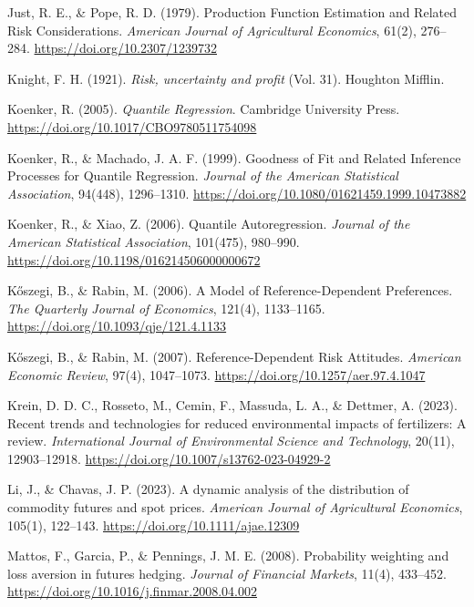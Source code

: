 \documentclass[12pt,a4paper]{article}
\begin{document}
\begin{description}
\item Just, R. E., \& Pope, R. D. (1979). Production Function Estimation and Related Risk Considerations. \textit{American Journal of Agricultural Economics}, 61(2), 276--284. \url{https://doi.org/10.2307/1239732}

\item Knight, F. H. (1921). \textit{Risk, uncertainty and profit} (Vol. 31). Houghton Mifflin.

\item Koenker, R. (2005). \textit{Quantile Regression}. Cambridge University Press. \url{https://doi.org/10.1017/CBO9780511754098}

\item Koenker, R., \& Machado, J. A. F. (1999). Goodness of Fit and Related Inference Processes for Quantile Regression. \textit{Journal of the American Statistical Association}, 94(448), 1296--1310. \url{https://doi.org/10.1080/01621459.1999.10473882}

\item Koenker, R., \& Xiao, Z. (2006). Quantile Autoregression. \textit{Journal of the American Statistical Association}, 101(475), 980--990. \url{https://doi.org/10.1198/016214506000000672}

\item K\H{o}szegi, B., \& Rabin, M. (2006). A Model of Reference-Dependent Preferences. \textit{The Quarterly Journal of Economics}, 121(4), 1133--1165. \url{https://doi.org/10.1093/qje/121.4.1133}

\item K\H{o}szegi, B., \& Rabin, M. (2007). Reference-Dependent Risk Attitudes. \textit{American Economic Review}, 97(4), 1047--1073. \url{https://doi.org/10.1257/aer.97.4.1047}

\item Krein, D. D. C., Rosseto, M., Cemin, F., Massuda, L. A., \& Dettmer, A. (2023). Recent trends and technologies for reduced environmental impacts of fertilizers: A review. \textit{International Journal of Environmental Science and Technology}, 20(11), 12903--12918. \url{https://doi.org/10.1007/s13762-023-04929-2}

\item Li, J., \& Chavas, J. P. (2023). A dynamic analysis of the distribution of commodity futures and spot prices. \textit{American Journal of Agricultural Economics}, 105(1), 122--143. \url{https://doi.org/10.1111/ajae.12309}

\item Mattos, F., Garcia, P., \& Pennings, J. M. E. (2008). Probability weighting and loss aversion in futures hedging. \textit{Journal of Financial Markets}, 11(4), 433--452. \url{https://doi.org/10.1016/j.finmar.2008.04.002}


\end{description}
\end{document}
